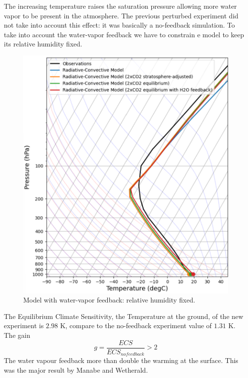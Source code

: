 The increasing temperature raises the saturation pressure allowing more water vapor to be present in the atmosphere. The previous perturbed experiment did not take into account this effect: it was basically a no-feedback simulation. To take into account the water-vapor feedback we have to constrain e model
to keep its relative humidity fixed.
\begin{figure}[h!]
	\centering
	\includegraphics[width=0.5\linewidth]{uploads/23.png}
	\caption{Model with water-vapor feedback: relative humidity fixed.}
	\label{fig:enter-label}
\end{figure}

The Equilibrium Climate Sensitivity, the Temperature at the
ground, of the new experiment is $2.98$ K, compare to the no-feedback experiment value of $1.31$ K. The gain
$$g=\frac{ECS}{ECS_{nofeedback}}>2$$
The water vapour feedback more than double the warming at
the surface. This was the major result by Manabe and
Wetherald.
